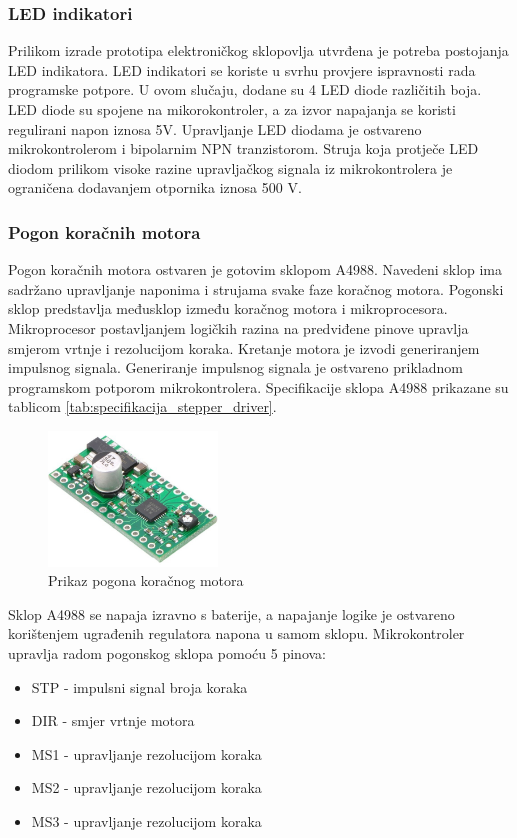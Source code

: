 \documentclass[11pt,a4paper]{article}
\begin{document}
\subsubsection{LED indikatori}
Prilikom izrade prototipa elektroničkog sklopovlja utvrđena je potreba postojanja LED indikatora. LED indikatori se koriste u svrhu provjere ispravnosti rada programske potpore. U ovom slučaju, dodane su 4 LED diode različitih boja. LED diode su spojene na mikorokontroler, a za izvor napajanja se koristi regulirani napon iznosa 5V. Upravljanje LED diodama je ostvareno mikrokontrolerom i bipolarnim NPN tranzistorom. Struja koja protječe LED diodom prilikom visoke razine upravljačkog signala iz mikrokontrolera je ograničena dodavanjem otpornika iznosa 500 V. 


\subsubsection{Pogon koračnih motora}

Pogon koračnih motora ostvaren je gotovim sklopom A4988. Navedeni sklop ima sadržano upravljanje naponima i strujama svake faze koračnog motora. Pogonski sklop predstavlja međusklop između koračnog motora i mikroprocesora. Mikroprocesor postavljanjem logičkih razina na predviđene pinove upravlja smjerom vrtnje i rezolucijom koraka. Kretanje motora je izvodi generiranjem impulsnog signala. Generiranje impulsnog signala je ostvareno prikladnom programskom potporom mikrokontrolera. Specifikacije sklopa A4988 prikazane su tablicom \ref{tab:specifikacija_stepper_driver}.


\begin{figure}[H]
	\centering
	\includegraphics[width=0.4\textwidth]{figures/driver.jpg}
	\caption{Prikaz pogona koračnog motora}
	\label{Slika:stepper_driver}
\end{figure}

Sklop A4988 se napaja izravno s baterije, a napajanje logike je ostvareno korištenjem ugrađenih regulatora napona u samom sklopu. Mikrokontroler upravlja radom pogonskog sklopa pomoću 5 pinova:
\begin{center}
	\begin{itemize}
		\item STP - impulsni signal broja koraka
		\item DIR - smjer vrtnje motora
		\item MS1 - upravljanje rezolucijom koraka
		\item MS2 - upravljanje rezolucijom koraka
		\item MS3 - upravljanje rezolucijom koraka
	\end{itemize}
\end{center}
\end{document}

